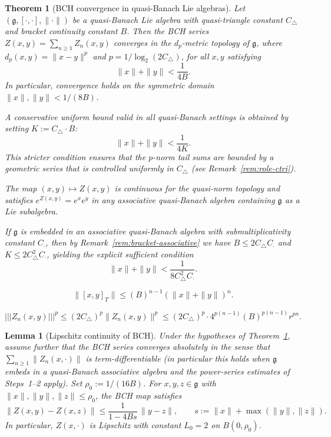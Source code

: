 \documentclass[10pt,a4paper]{amsart}
\newtheorem{theorem}{Theorem}
\newtheorem{lemma}{Lemma}
\newcommand{\Cbracket}{B}            %
\newcommand{\Cmult}{C_{\cdot}}       %
\newcommand{\Ctotal}{K}              %
\newcommand{\Ctri}{C_{\triangle}}    %
\newcommand{\pnorm}[1]{\left\vert\!\left\vert\!\left\vert #1 \right\vert\!\right\vert\!\right\vert} %
\begin{document}
\begin{theorem}[BCH convergence in quasi-Banach Lie algebras]\label{thm:BCH}
Let $(\mathfrak{g},[\cdot,\cdot],\|\cdot\|)$ be a quasi-Banach Lie algebra with
quasi-triangle constant $\Ctri$ and bracket continuity constant $\Cbracket$.  Then the
BCH series $Z(x,y) = \sum_{n\ge 1} Z_n(x,y)$ converges in the $d_p$-metric topology of
$\mathfrak{g}$, where $d_p(x,y) = \|x-y\|^p$ and $p = 1/\log_2(2\Ctri)$, for all $x,y$
satisfying
\begin{equation}\label{eq:BCH-radius}
  \|x\| + \|y\| < \frac{1}{4\Cbracket}.
\end{equation}
In particular, convergence holds on the symmetric domain $\|x\|,\|y\| < 1/(8\Cbracket)$.

A conservative uniform bound valid in all quasi-Banach settings is obtained by setting
$\Ctotal := \Ctri \cdot \Cbracket$:
\[
  \|x\| + \|y\| < \frac{1}{4\Ctotal}.
\]
This stricter condition ensures that the $p$-norm tail sums are bounded by a geometric
series that is controlled uniformly in $\Ctri$ (see Remark~\ref{rem:role-ctri}).

The map $(x,y)\mapsto Z(x,y)$ is continuous for the quasi-norm topology and satisfies
$e^{Z(x,y)} = e^x e^y$ in any associative quasi-Banach algebra containing $\mathfrak{g}$
as a Lie subalgebra.

If $\mathfrak{g}$ is embedded in an associative quasi-Banach algebra with
submultiplicativity constant $\Cmult$, then by Remark~\ref{rem:bracket-associative} we
have $\Cbracket \leq 2\Ctri\Cmult$ and $\Ctotal \leq 2\Ctri^2\Cmult$, yielding the
explicit sufficient condition
\[
  \|x\| + \|y\| < \frac{1}{8\Ctri^2\Cmult}.
\]
\end{theorem}

\begin{equation}\label{eq:tree}
  \|[x,y]_T\| \le (\Cbracket)^{n-1}(\|x\|+\|y\|)^n.
\end{equation}

\begin{equation}\label{eq:pnorm-bound}
  \pnorm{Z_n(x,y)}^p
  \le (2\Ctri)^p \|Z_n(x,y)\|^p
  \le (2\Ctri)^p \cdot 4^{p(n-1)}(\Cbracket)^{p(n-1)} r^{pn}.
\end{equation}

\begin{lemma}[Lipschitz continuity of BCH]\label{lem:bch-lipschitz}
Under the hypotheses of Theorem~\ref{thm:BCH}, assume further that the BCH series
converges absolutely in the sense that $\sum_{n \ge 1} \|Z_n(x,\cdot)\|$ is
term-differentiable (in particular this holds when $\mathfrak{g}$ embeds in a quasi-Banach
associative algebra and the power-series estimates of Steps~1--2 apply).
Set $\rho_0 := 1/(16\Cbracket)$.
For $x, y, z \in \mathfrak{g}$ with $\|x\|,\|y\|,\|z\| \le \rho_0$, the
BCH map satisfies
\[
  \|Z(x,y) - Z(x,z)\| \le \frac{1}{1 - 4\Cbracket s}\,\|y - z\|,
  \qquad s := \|x\| + \max(\|y\|,\|z\|).
\]
In particular, $Z(x,\cdot)$ is Lipschitz with constant $L_0 = 2$ on $B(0,\rho_0)$.
\end{lemma}
\end{document}
